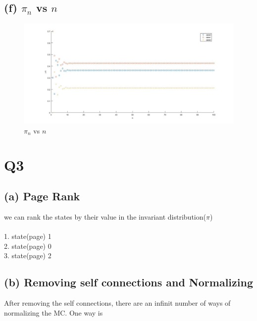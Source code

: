 \documentclass[a4paper,11pt]{report}
\begin{document}
\subsection*{(f) $\pi_n$  vs $n$}

\begin{figure}[htbp]
        \includegraphics[scale=0.35]{2f}
        \caption{$\pi_n$ vs $n$}
\end{figure}
\newpage 
\section*{Q3}
\subsection*{(a) Page Rank}
we can rank the states by their value in the invariant distribution($\pi$)\\\\
1. state(page) 1\\
2. state(page) 0\\
3. state(page) 2\\
\subsection*{(b) Removing self connections and Normalizing}
After removing the self connections, there are an infinit number of ways of normalizing the MC. One way is \\
\end{document}
